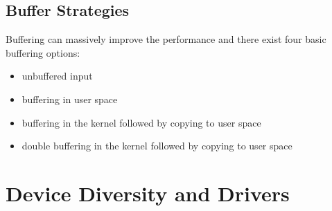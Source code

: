 		\subsection{Buffer Strategies}
			Buffering can massively improve the performance and there exist four basic buffering options:
			\begin{itemize}
				\item unbuffered input
				\item buffering in user space
				\item buffering in the kernel followed by copying to user space
				\item double buffering in the kernel followed by copying to user space
			\end{itemize}

	\section{Device Diversity and Drivers}
